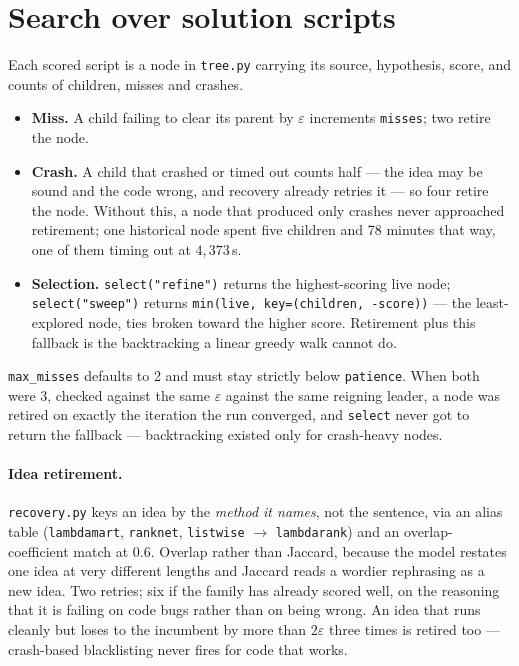 \documentclass[11pt,a4paper]{article}
\newcommand{\code}[1]{\texttt{#1}}
\newcommand{\file}[1]{\texttt{#1}}
\begin{document}
\section{Search over solution scripts}

Each scored script is a node in \file{tree.py} carrying its source, hypothesis, score, and counts
of children, misses and crashes.

\begin{itemize}[leftmargin=1.3em, itemsep=2pt]
  \item \textbf{Miss.} A child failing to clear its parent by $\varepsilon$ increments
        \code{misses}; two retire the node.
  \item \textbf{Crash.} A child that crashed or timed out counts half --- the idea may be sound and
        the code wrong, and recovery already retries it --- so four retire the node. Without this,
        a node that produced only crashes never approached retirement; one historical node spent
        five children and 78 minutes that way, one of them timing out at $4{,}373$\,s.
  \item \textbf{Selection.} \code{select("refine")} returns the highest-scoring live node;
        \code{select("sweep")} returns \code{min(live, key=(children, -score))} --- the
        least-explored node, ties broken toward the higher score. Retirement plus this fallback is
        the backtracking a linear greedy walk cannot do.
\end{itemize}

\code{max\_misses} defaults to 2 and must stay strictly below \code{patience}. When both were 3,
checked against the same $\varepsilon$ against the same reigning leader, a node was retired on
exactly the iteration the run converged, and \code{select} never got to return the fallback ---
backtracking existed only for crash-heavy nodes.

\paragraph{Idea retirement.} \file{recovery.py} keys an idea by the \emph{method it names}, not the
sentence, via an alias table (\code{lambdamart}, \code{ranknet}, \code{listwise}
$\rightarrow$ \code{lambdarank}) and an overlap-coefficient match at $0.6$. Overlap rather than
Jaccard, because the model restates one idea at very different lengths and Jaccard reads a wordier
rephrasing as a new idea. Two retries; six if the family has already scored well, on the reasoning
that it is failing on code bugs rather than on being wrong. An idea that runs cleanly but loses to
the incumbent by more than $2\varepsilon$ three times is retired too --- crash-based blacklisting
never fires for code that works.
\end{document}
